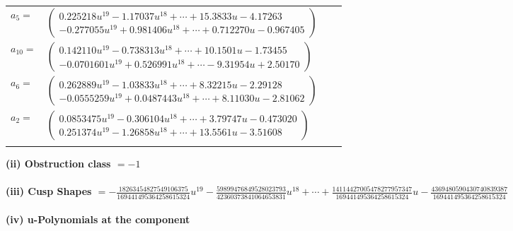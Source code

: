 \documentclass[1p]{elsarticle_modified}
\theoremstyle{definition}
\begin{document}
\begin{tabular}{m{7pt} m{180pt} m{7pt} m{180pt} }
\flushright $a_{5}=$&$\begin{pmatrix}0.225218 u^{19}-1.17037 u^{18}+\cdots+15.3833 u-4.17263\\-0.277055 u^{19}+0.981406 u^{18}+\cdots+0.712270 u-0.967405\end{pmatrix}$ \\
\flushright $a_{10}=$&$\begin{pmatrix}0.142110 u^{19}-0.738313 u^{18}+\cdots+10.1501 u-1.73455\\-0.0701601 u^{19}+0.526991 u^{18}+\cdots-9.31954 u+2.50170\end{pmatrix}$ \\
\flushright $a_{6}=$&$\begin{pmatrix}0.262889 u^{19}-1.03833 u^{18}+\cdots+8.32215 u-2.29128\\-0.0555259 u^{19}+0.0487443 u^{18}+\cdots+8.11030 u-2.81062\end{pmatrix}$ \\
\flushright $a_{2}=$&$\begin{pmatrix}0.0853475 u^{19}-0.306104 u^{18}+\cdots+3.79747 u-0.473020\\0.251374 u^{19}-1.26858 u^{18}+\cdots+13.5561 u-3.51608\end{pmatrix}$\\&\end{tabular}
\flushleft \textbf{(ii) Obstruction class $= -1$}\\~\\
\flushleft \textbf{(iii) Cusp Shapes $= -\frac{18263454827549106375}{169441495364258615324} u^{19}-\frac{59899476849528023793}{42360373841064653831} u^{18}+\cdots+\frac{14114427005478277957347}{169441495364258615324} u-\frac{4369480590430740839387}{169441495364258615324}$}\\~\\
\newpage\renewcommand{\arraystretch}{1}
\flushleft \textbf{(iv) u-Polynomials at the component}\newline \\
\end{document}
